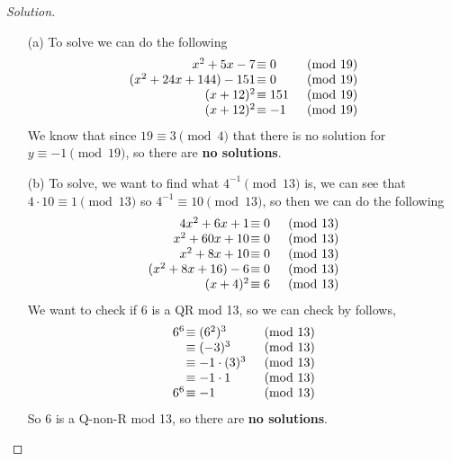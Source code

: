 \documentclass[11pt]{article}
\newenvironment{solution}
  {\renewcommand\qedsymbol{$~$}\begin{proof}[Solution]$ $\par\nobreak\ignorespaces}
  {\end{proof}}
\begin{document}
\begin{solution}
  \begin{itemize}
    \item [(a)] To solve we can do the following
          \[\begin{array}{r @{\hspace{1pt}} l l}
              x^2+5x-7          & \equiv 0   & \pmod{19} \\
              (x^2+24x+144)-151 & \equiv 0   & \pmod{19} \\
              (x+12)^2          & \equiv 151 & \pmod{19} \\
              (x+12)^2          & \equiv -1  & \pmod{19} \\
            \end{array}\]
          We know that since $19\equiv 3 \pmod{4}$ that there is no solution for $y\equiv -1 \pmod{19}$, so there are \textbf{no solutions}.
    \item [(b)] To solve, we want to find what $4^{-1}\pmod{13}$ is, we can see that $4\cdot 10\equiv 1 \pmod{13}$ so $4^{-1}\equiv 10 \pmod{13}$, so then we can do the following
          \[\begin{array}{r @{\hspace{1pt}} l l}
              4x^2+6x+1       & \equiv 0 & \pmod{13} \\
              x^2+60x+10      & \equiv 0 & \pmod{13} \\
              x^2+8x+10       & \equiv 0 & \pmod{13} \\
              (x^2+8x+16) - 6 & \equiv 0 & \pmod{13} \\
              (x+4)^2         & \equiv 6 & \pmod{13} \\
            \end{array}\]
          We want to check if 6 is a QR mod 13, so we can check by follows,
          \[\begin{array}{r @{\hspace{1pt}} l l}
              6^{6} & \equiv (6^2)^3       & \pmod{13} \\
                    & \equiv (-3)^3        & \pmod{13} \\
                    & \equiv -1\cdot (3)^3 & \pmod{13} \\
                    & \equiv -1\cdot 1     & \pmod{13} \\
              6^{6} & \equiv -1            & \pmod{13} \\
            \end{array}\]
          So 6 is a Q-non-R mod 13, so there are \textbf{no solutions}.
  \end{itemize}
\end{solution}
\end{document}
